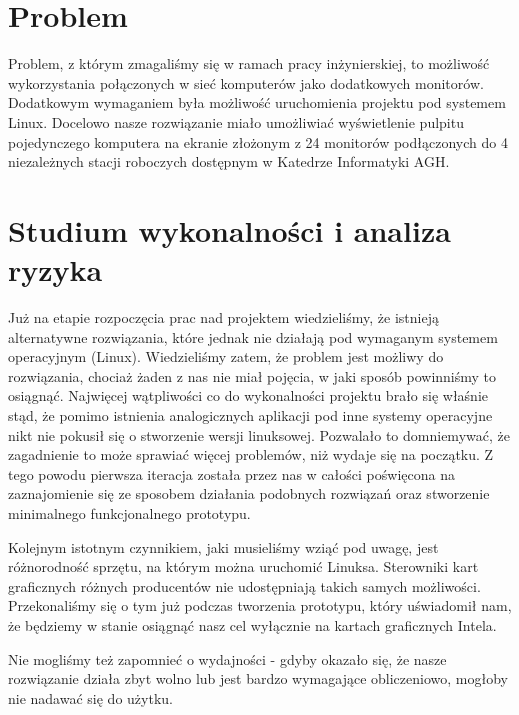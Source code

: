 


\subtitle{Dokumentacja procesowa}
\maketitle

\tableofcontents
\vfill
\pagebreak

\section{Problem}

Problem, z którym zmagaliśmy się w ramach pracy inżynierskiej, to możliwość wykorzystania połączonych w sieć komputerów jako dodatkowych monitorów. Dodatkowym wymaganiem była możliwość uruchomienia projektu pod systemem Linux. Docelowo nasze rozwiązanie miało umożliwiać wyświetlenie pulpitu pojedynczego komputera na ekranie złożonym z 24 monitorów podłączonych do 4 niezależnych stacji roboczych dostępnym w Katedrze Informatyki AGH.

\section{Studium wykonalności i analiza ryzyka}

Już na etapie rozpoczęcia prac nad projektem wiedzieliśmy, że istnieją alternatywne rozwiązania, które jednak nie działają pod wymaganym systemem operacyjnym (Linux). Wiedzieliśmy zatem, że problem jest możliwy do rozwiązania, chociaż żaden z nas nie miał pojęcia, w jaki sposób powinniśmy to osiągnąć. Najwięcej wątpliwości co do wykonalności projektu brało się właśnie stąd, że pomimo istnienia analogicznych aplikacji pod inne systemy operacyjne nikt nie pokusił się o stworzenie wersji linuksowej. Pozwalało to domniemywać, że zagadnienie to może sprawiać więcej problemów, niż wydaje się na początku. Z tego powodu pierwsza iteracja została przez nas w całości poświęcona na zaznajomienie się ze sposobem działania podobnych rozwiązań oraz stworzenie minimalnego funkcjonalnego prototypu.

Kolejnym istotnym czynnikiem, jaki musieliśmy wziąć pod uwagę, jest różnorodność sprzętu, na którym można uruchomić Linuksa. Sterowniki kart graficznych różnych producentów nie udostępniają takich samych możliwości. Przekonaliśmy się o tym już podczas tworzenia prototypu, który uświadomił nam, że będziemy w stanie osiągnąć nasz cel wyłącznie na kartach graficznych Intela.

Nie mogliśmy też zapomnieć o wydajności - gdyby okazało się, że nasze rozwiązanie działa zbyt wolno lub jest bardzo wymagające obliczeniowo, mogłoby nie nadawać się do użytku.

